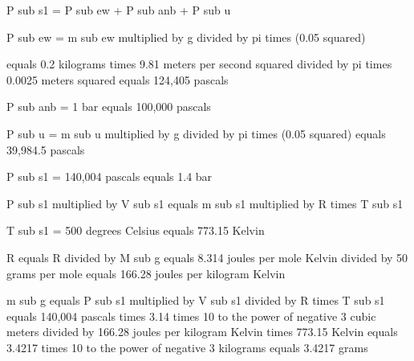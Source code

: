 P sub s1 = P sub ew + P sub anb + P sub u

P sub ew = m sub ew multiplied by g divided by pi times (0.05 squared)

equals 0.2 kilograms times 9.81 meters per second squared divided by pi times 0.0025 meters squared equals 124,405 pascals

P sub anb = 1 bar equals 100,000 pascals

P sub u = m sub u multiplied by g divided by pi times (0.05 squared) equals 39,984.5 pascals

P sub s1 = 140,004 pascals equals 1.4 bar

P sub s1 multiplied by V sub s1 equals m sub s1 multiplied by R times T sub s1

T sub s1 = 500 degrees Celsius equals 773.15 Kelvin

R equals R divided by M sub g equals 8.314 joules per mole Kelvin divided by 50 grams per mole equals 166.28 joules per kilogram Kelvin

m sub g equals P sub s1 multiplied by V sub s1 divided by R times T sub s1 equals 140,004 pascals times 3.14 times 10 to the power of negative 3 cubic meters divided by 166.28 joules per kilogram Kelvin times 773.15 Kelvin equals 3.4217 times 10 to the power of negative 3 kilograms equals 3.4217 grams